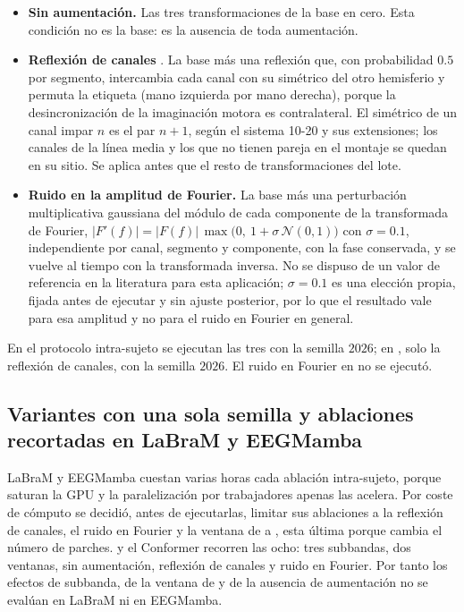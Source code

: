 \begin{itemize}
  \item \textbf{Sin aumentación.} Las tres transformaciones de la base en cero. Esta
  condición no es la base: es la ausencia de toda aumentación.
  \item \textbf{Reflexión de canales} \cite{wang2024channelreflection}. La base más una
  reflexión que, con probabilidad $0.5$ por segmento, intercambia cada canal con su simétrico
  del otro hemisferio y permuta la etiqueta (mano izquierda por mano derecha), porque la
  desincronización de la imaginación motora es contralateral. El simétrico de un canal impar
  $n$ es el par $n+1$, según el sistema 10-20 y sus extensiones; los canales de la línea media
  y los que no tienen pareja en el montaje se quedan en su sitio. Se aplica antes que el
  resto de transformaciones del lote.
  \item \textbf{Ruido en la amplitud de Fourier.} La base más una perturbación
  multiplicativa gaussiana del módulo de cada componente de la transformada de Fourier,
  $|F'(f)| = |F(f)|\,\max\!\bigl(0,\ 1 + \sigma\,\mathcal{N}(0,1)\bigr)$ con $\sigma = 0.1$,
  independiente por canal, segmento y componente, con la fase conservada, y se vuelve al
  tiempo con la transformada inversa. No se dispuso de un valor de referencia en la
  literatura para esta aplicación; $\sigma = 0.1$ es una elección propia, fijada antes de
  ejecutar y sin ajuste posterior, por lo que el resultado vale para esa amplitud y no para
  el ruido en Fourier en general.
\end{itemize}

En el protocolo intra-sujeto se ejecutan las tres con la semilla $2026$; en \loso{}, solo la
reflexión de canales, con la semilla $2026$. El ruido en Fourier en \loso{} no se ejecutó.

\subsection{Variantes con una sola semilla y ablaciones recortadas en LaBraM y EEGMamba}
\label{sec:ablaciones-recortadas}

LaBraM y EEGMamba cuestan varias horas cada ablación intra-sujeto, porque
saturan la GPU y la paralelización por trabajadores apenas las acelera. Por coste de
cómputo se decidió, antes de ejecutarlas, limitar sus ablaciones a la reflexión de canales,
el ruido en Fourier y la ventana de  a , esta última porque cambia el número
de parches. \eegnet{} y el Conformer recorren las ocho: tres subbandas, dos ventanas, sin
aumentación, reflexión de canales y ruido en Fourier. Por tanto los efectos de subbanda,
de la ventana de  y de la ausencia de aumentación no se evalúan en LaBraM ni en
EEGMamba.


